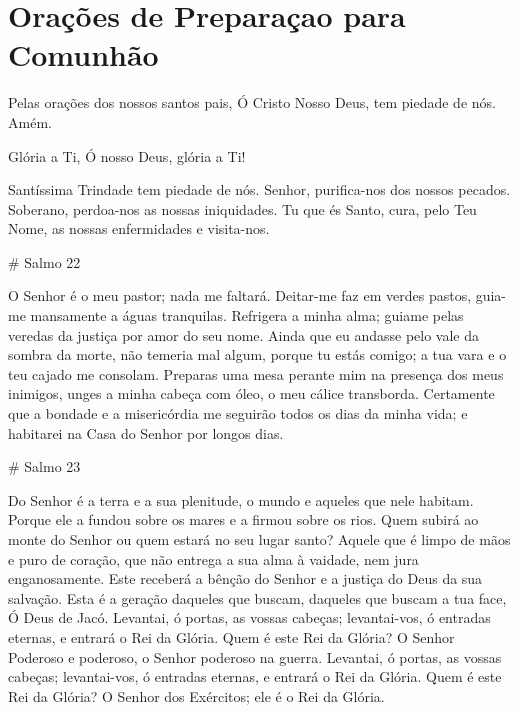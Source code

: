 \documentclass{subfiles}
\begin{document}
\chapter{Orações de Preparaçao para Comunhão}

Pelas orações dos nossos santos pais, Ó Cristo Nosso Deus, tem
piedade de nós. Amém.

Glória a Ti, Ó nosso Deus, glória a Ti!

\comforter{}

\trisagion{} \thrice{}

\Doxology{}

Santíssima Trindade tem piedade de nós. Senhor, purifica-nos dos
nossos pecados. Soberano, perdoa-nos as nossas iniquidades. Tu que és Santo,
cura, pelo Teu Nome, as nossas enfermidades e visita-nos.

\mercy{} \thrice{}

\Doxology{}

\ourFather{}

\mercy{} \thrice{}


# Salmo 22

O Senhor é o meu pastor; nada me faltará. Deitar-me faz em verdes pastos,
guia-me mansamente a águas tranquilas. Refrigera a minha alma; guiame pelas
veredas da justiça por amor do seu nome. Ainda que eu andasse pelo vale da
sombra da morte, não temeria mal algum, porque tu estás comigo; a tua vara e o
teu cajado me consolam. Preparas uma mesa perante mim na presença dos meus
inimigos, unges a minha cabeça com óleo, o meu cálice transborda. Certamente que
a bondade e a misericórdia me seguirão todos os dias da minha vida; e habitarei
na Casa do Senhor por longos dias.

# Salmo 23

Do Senhor é a terra e a sua plenitude, o mundo e aqueles que nele habitam.
Porque ele a fundou sobre os mares e a firmou sobre os rios. Quem subirá ao
monte do Senhor ou quem estará no seu lugar santo? Aquele que é limpo de mãos e
puro de coração, que não entrega a sua alma à vaidade, nem jura enganosamente.
Este receberá a bênção do Senhor e a justiça do Deus da sua salvação. Esta é a
geração daqueles que buscam, daqueles que buscam a tua face, Ó Deus de Jacó.
Levantai, ó portas, as vossas cabeças; levantai-vos, ó entradas eternas, e
entrará o Rei da Glória. Quem é este Rei da Glória? O Senhor Poderoso e
poderoso, o Senhor poderoso na guerra. Levantai, ó portas, as vossas cabeças;
levantai-vos, ó entradas eternas, e entrará o Rei da Glória. Quem é este Rei da
Glória? O Senhor dos Exércitos; ele é o Rei da Glória.
\end{document}
